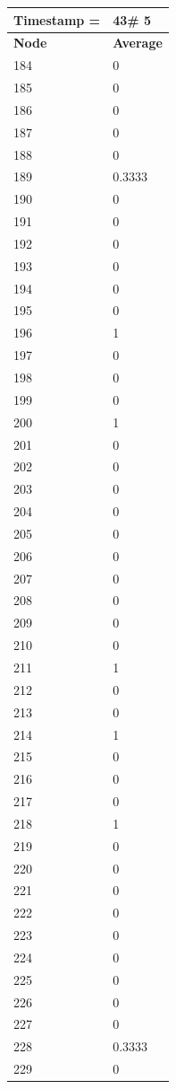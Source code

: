 \begin{tabular}{|l||l|}
\hline
\textbf{Timestamp =} & \textbf{43}\# 5\\\hline
	\textbf{Node} & \textbf{Average} \\ \hline
\hline
	184 & 0 \\ \hline
	185 & 0 \\ \hline
	186 & 0 \\ \hline
	187 & 0 \\ \hline
	188 & 0 \\ \hline
	189 & 0.3333 \\ \hline
	190 & 0 \\ \hline
	191 & 0 \\ \hline
	192 & 0 \\ \hline
	193 & 0 \\ \hline
	194 & 0 \\ \hline
	195 & 0 \\ \hline
	196 & 1 \\ \hline
	197 & 0 \\ \hline
	198 & 0 \\ \hline
	199 & 0 \\ \hline
	200 & 1 \\ \hline
	201 & 0 \\ \hline
	202 & 0 \\ \hline
	203 & 0 \\ \hline
	204 & 0 \\ \hline
	205 & 0 \\ \hline
	206 & 0 \\ \hline
	207 & 0 \\ \hline
	208 & 0 \\ \hline
	209 & 0 \\ \hline
	210 & 0 \\ \hline
	211 & 1 \\ \hline
	212 & 0 \\ \hline
	213 & 0 \\ \hline
	214 & 1 \\ \hline
	215 & 0 \\ \hline
	216 & 0 \\ \hline
	217 & 0 \\ \hline
	218 & 1 \\ \hline
	219 & 0 \\ \hline
	220 & 0 \\ \hline
	221 & 0 \\ \hline
	222 & 0 \\ \hline
	223 & 0 \\ \hline
	224 & 0 \\ \hline
	225 & 0 \\ \hline
	226 & 0 \\ \hline
	227 & 0 \\ \hline
	228 & 0.3333 \\ \hline
	229 & 0 \\ \hline
\end{tabular}
